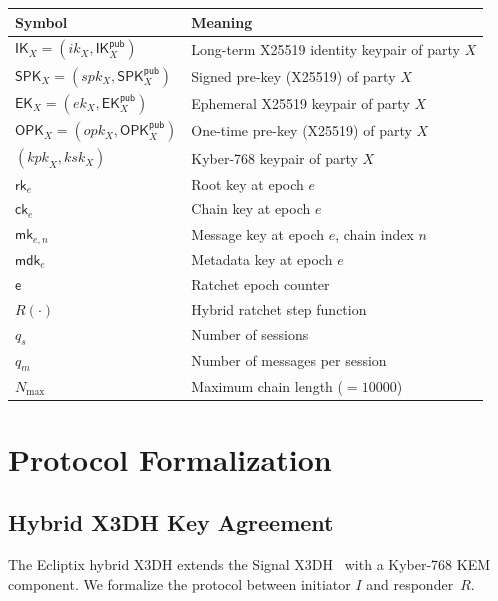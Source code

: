 \documentclass[11pt,a4paper]{article}
\theoremstyle{definition}
\theoremstyle{remark}
\newcommand{\IK}{\mathsf{IK}}
\newcommand{\SPK}{\mathsf{SPK}}
\newcommand{\EK}{\mathsf{EK}}
\newcommand{\OPK}{\mathsf{OPK}}
\newcommand{\rk}{\mathsf{rk}}
\newcommand{\ck}{\mathsf{ck}}
\newcommand{\mk}{\mathsf{mk}}
\newcommand{\mdk}{\mathsf{mdk}}
\newcommand{\epoch}{\mathsf{e}}
\begin{document}
\begin{center}
\renewcommand{\arraystretch}{1.25}
\begin{tabular}{@{}ll@{}}
\toprule
\textbf{Symbol} & \textbf{Meaning} \\
\midrule
$\IK_X = (ik_X, \IK_X^{\mathsf{pub}})$ & Long-term X25519 identity keypair of party $X$ \\
$\SPK_X = (spk_X, \SPK_X^{\mathsf{pub}})$ & Signed pre-key (X25519) of party $X$ \\
$\EK_X = (ek_X, \EK_X^{\mathsf{pub}})$ & Ephemeral X25519 keypair of party $X$ \\
$\OPK_X = (opk_X, \OPK_X^{\mathsf{pub}})$ & One-time pre-key (X25519) of party $X$ \\
$(\mathit{kpk}_X, \mathit{ksk}_X)$ & Kyber-768 keypair of party $X$ \\
$\rk_e$ & Root key at epoch $e$ \\
$\ck_e$ & Chain key at epoch $e$ \\
$\mk_{e,n}$ & Message key at epoch $e$, chain index $n$ \\
$\mdk_e$ & Metadata key at epoch $e$ \\
$\epoch$ & Ratchet epoch counter \\
$R(\cdot)$ & Hybrid ratchet step function \\
$q_s$ & Number of sessions \\
$q_m$ & Number of messages per session \\
$N_{\max}$ & Maximum chain length ($= 10000$) \\
\bottomrule
\end{tabular}
\end{center}


\section{Protocol Formalization}
\label{sec:protocol}

\subsection{Hybrid X3DH Key Agreement}
\label{subsec:x3dh}

The Ecliptix hybrid X3DH extends the Signal X3DH~\cite{signal-x3dh} with a
Kyber-768 KEM component.  We formalize the protocol between initiator $I$ and
responder~$R$.
\end{document}
